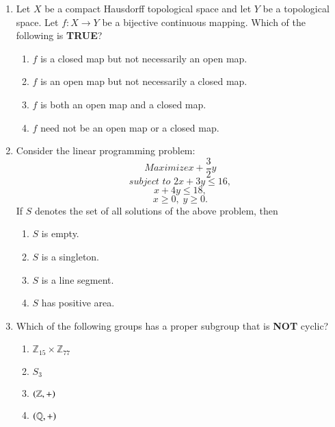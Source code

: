 \documentclass[journal]{IEEEtran}
\begin{document}
\begin{enumerate}
\item  Let  $X$  be a compact Hausdorff topological space and let  $Y$  be a topological space. Let $ f : X \to Y $ be a bijective continuous mapping. Which of the following is \textbf{TRUE}?
\begin{enumerate}
    \item $f$ is a closed map but not necessarily an open map.
    \item $f$ is an open map but not necessarily a closed map.
    \item $f$ is both an open map and a closed map.
    \item $f$ need not be an open map or a closed map.
\end{enumerate}

\item Consider the linear programming problem:
\[
Maximize  x + \frac{3}{2} y
\]
\[
 subject\,\,to\,\,2x + 3y \leq 16,
\]
\[
x + 4y \leq 18,
\]
\[
x \geq 0, \; y \geq 0.
\]
If $S$ denotes the set of all solutions of the above problem, then
\begin{multicols}{2}
\begin{enumerate}
    \item $S$ is empty.
    \item $S$ is a singleton.
    \item $S$ is a line segment.
    \item $S$ has positive area.
\end{enumerate}
\end{multicols}
\item Which of the following groups has a proper subgroup that is \textbf{NOT} cyclic?
\begin{enumerate}
    \item  $ \mathbb{Z}_{15} \times \mathbb{Z}_{77} $
    \item  $ S_3 $
    \item  $ \left(\mathbb{Z}, +\right) $
    \item  $ \left(\mathbb{Q}, +\right) $
\end{enumerate}


\end{enumerate}
\end{document}
